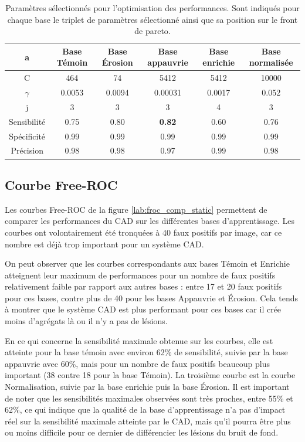 \begin{table}[h!]
\label{fig:paramsParams}
		\begin{tabular}{c c c c c c}
  \hline
  a	& Base Témoin 	& Base Érosion	& Base appauvrie& Base enrichie & Base normalisée \\
  \hline
 C 	& 464		& 74		& 5412		& 5412		& 10000 \\
\hline
$\gamma$& 0.0053	& 0.0094	& 0.00031	& 0.0017	& 0.052 \\
\hline
j	& 3		& 3		& 3		& 4		& 3	\\
\hline
\hline
Sensibilité& 0.75	& 0.80		& \textbf{0.82}		& 0.60		& 0.76	\\
\hline
Spécificité& 0.99	& 0.99		& 0.99		& 0.99		& 0.99 \\
\hline
Précision& 0.98		& 0.98		& 0.97		& 0.99		& 0.98 \\
\hline
 		\end{tabular}

\caption{Paramètres sélectionnés pour l'optimisation des performances. Sont indiqués pour chaque base le triplet de paramètres sélectionné ainsi que sa position sur le front de pareto.}
\end{table}

\FloatBarrier

\subsection{Courbe Free-ROC}

Les courbes Free-ROC de la figure \ref{lab:froc_comp_static} permettent de comparer les performances du CAD sur les différentes bases d'apprentissage. Les courbes ont volontairement été tronquées à 40 faux positifs par image, car ce nombre est déjà trop important pour un système CAD.

On peut observer que les courbes correspondants aux bases Témoin et Enrichie atteignent leur maximum de performances pour un nombre de faux positifs relativement faible par rapport aux autres bases : entre 17 et 20 faux positifs pour ces bases, contre plus de 40 pour les bases Appauvrie et \'Erosion. Cela tends à montrer que le système CAD est plus performant pour ces bases car il crée moins d'agrégats là ou il n'y a pas de lésions.

En ce qui concerne la sensibilité maximale obtenue sur les courbes, elle est atteinte pour la base témoin avec environ 62\% de sensibilité, suivie par la base appauvrie avec 60\%, mais pour un nombre de faux positifs beaucoup plus important (38 contre 18 pour la base Témoin). La troisième courbe est la courbe Normalisation, suivie par la base enrichie puis la base \'Erosion. Il est important de noter que les sensibilités maximales observées sont très proches, entre 55\% et 62\%, ce qui indique que la qualité de la base d'apprentissage n'a pas d'impact réel sur la sensibilité maximale atteinte par le CAD, mais qu'il pourra être plus ou moins difficile pour ce dernier de différencier les lésions du bruit de fond. 

